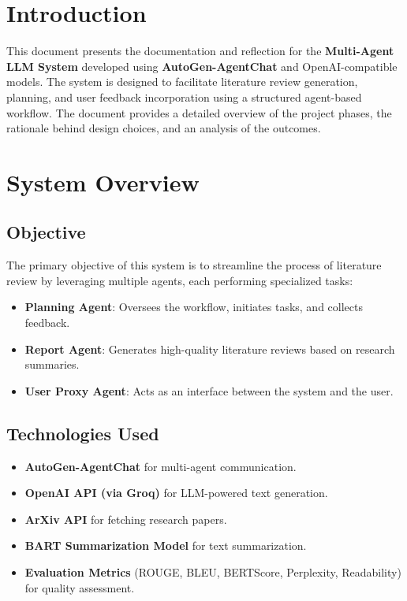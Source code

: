 \setcounter{page}{1}


\section{Introduction}
This document presents the documentation and reflection for the \textbf{Multi-Agent LLM System} developed using \textbf{AutoGen-AgentChat} and OpenAI-compatible models. The system is designed to facilitate literature review generation, planning, and user feedback incorporation using a structured agent-based workflow. The document provides a detailed overview of the project phases, the rationale behind design choices, and an analysis of the outcomes.

\section{System Overview}
\subsection{Objective}
The primary objective of this system is to streamline the process of literature review by leveraging multiple agents, each performing specialized tasks:
\begin{itemize}
\item \textbf{Planning Agent}: Oversees the workflow, initiates tasks, and collects feedback.
\item \textbf{Report Agent}: Generates high-quality literature reviews based on research summaries.
\item \textbf{User Proxy Agent}: Acts as an interface between the system and the user.
\end{itemize}

\subsection{Technologies Used}
\begin{itemize}
\item \textbf{AutoGen-AgentChat} for multi-agent communication.
\item \textbf{OpenAI API (via Groq)} for LLM-powered text generation.
\item \textbf{ArXiv API} for fetching research papers.
\item \textbf{BART Summarization Model} for text summarization.
\item \textbf{Evaluation Metrics} (ROUGE, BLEU, BERTScore, Perplexity, Readability) for quality assessment.
\end{itemize}

